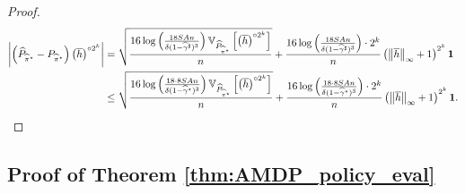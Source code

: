 \documentclass{article}
\theoremstyle{plain}
\theoremstyle{plain}
\theoremstyle{remark}
\theoremstyle{plain}
\theoremstyle{plain}
\newcommand{\Var}{\mathbb{V}}
\newcommand{\Phat}{\widehat{P}}
\newcommand{\pihstar}{\widehat{\pi}^\star}
\newcommand{\one}{\mathbf{1}}
\newcommand{\hc}{\overline{h}}
\newcommand{\empbod}{\widehat{\gamma}^\star}
\newcommand{\empbodd}{\widehat{\gamma}^{\sharp}}
\begin{document}
\begin{proof}
    \begin{align*}
        \left| \left(\Phat_{\pihstar} - P_{\pihstar}\right) \left( \hc \right)^{\circ 2^k} \right|
    &= \sqrt{\frac{16 \log \left(\frac{18 SA n }{ \delta (1-\empbodd)^3}  \right)   \Var_{\Phat_{\pihstar}} \left[ \left(\hc \right)^{\circ 2^k}  \right]    }{n }} + \frac{ 16 \log \left(\frac{18 SA n }{ \delta (1-\empbodd)^3} \right)  \cdot 2^k }{n}  \left( \infnorm{\hc} + 1\right)^{2^k}   \one \\
    & \leq  \sqrt{\frac{16 \log \left(\frac{18\cdot 8 SA n }{ \delta (1-\empbod)^3}  \right)   \Var_{\Phat_{\pihstar}} \left[ \left(\hc \right)^{\circ 2^k}  \right]    }{n }} + \frac{ 16 \log \left(\frac{18\cdot 8 SA n }{ \delta (1-\empbod)^3} \right)  \cdot 2^k }{n}  \left( \infnorm{\hc} + 1\right)^{2^k}   \one.
    \end{align*}
\end{proof}


\subsection{Proof of Theorem \ref{thm:AMDP_policy_eval}}
\label{sec:AMDP_policy_eval_pf}
\end{document}
